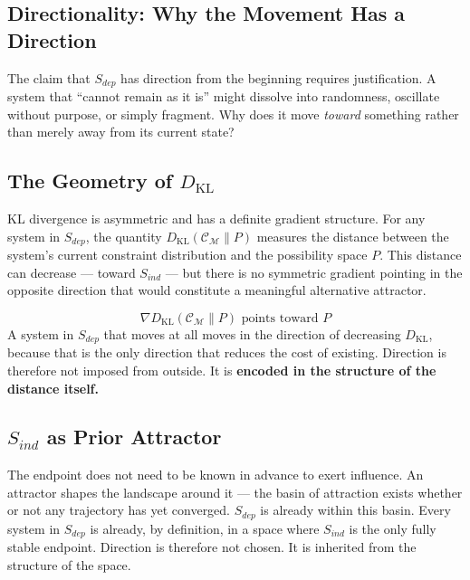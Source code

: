 \documentclass[12pt, a4paper]{article}
\begin{document}
\subsection*{Directionality: Why the Movement Has a Direction}

The claim that $S_{dep}$ has direction from the beginning requires justification.
A system that ``cannot remain as it is'' might dissolve into randomness, oscillate
without purpose, or simply fragment. Why does it move \textit{toward} something
rather than merely away from its current state?

\subsection{The Geometry of $D_{\mathrm{KL}}$}

KL divergence is asymmetric and has a definite gradient structure. For any system
in $S_{dep}$, the quantity $D_{\mathrm{KL}}(\mathcal{C}_\mathcal{M}\|P)$ measures
the distance between the system's current constraint distribution and the possibility
space $P$. This distance can decrease --- toward $S_{ind}$ --- but there is no
symmetric gradient pointing in the opposite direction that would constitute a
meaningful alternative attractor.

\begin{derivedbox}[title={Direction is Encoded in the Distance Itself}]
\[
  \nabla D_{\mathrm{KL}}(\mathcal{C}_\mathcal{M}\|P) \text{ points toward } P
\]
A system in $S_{dep}$ that moves at all moves in the direction of decreasing
$D_{\mathrm{KL}}$, because that is the only direction that reduces the cost of
existing. Direction is therefore not imposed from outside. It is \textbf{encoded
in the structure of the distance itself.}
\end{derivedbox}

\subsection{$S_{ind}$ as Prior Attractor}

The endpoint does not need to be known in advance to exert influence. An attractor
shapes the landscape around it --- the basin of attraction exists whether or not any
trajectory has yet converged. $S_{dep}$ is already within this basin. Every system
in $S_{dep}$ is already, by definition, in a space where $S_{ind}$ is the only fully
stable endpoint. Direction is therefore not chosen. It is inherited from the structure
of the space.
\end{document}
